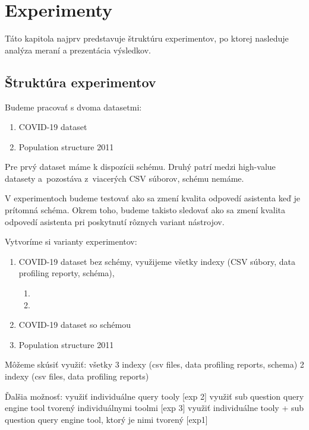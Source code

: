 \chapter{Experimenty}

Táto kapitola najprv predstavuje štruktúru experimentov, po ktorej nasleduje analýza meraní a prezentácia výsledkov.

\section{Štruktúra experimentov}

Budeme pracovať s dvoma datasetmi:
\begin{enumerate}
\item COVID-19 dataset
\item Population structure 2011
\end{enumerate}

Pre prvý dataset máme k dispozícii schému. Druhý patrí medzi high-value datasety a~pozostáva z~viacerých CSV súborov, schému nemáme.

V experimentoch budeme testovať ako sa zmení kvalita odpovedí asistenta keď je prítomná schéma. Okrem toho, budeme takisto sledovať ako sa zmení kvalita odpovedí asistenta pri poskytnutí rôznych variant nástrojov.

Vytvoríme si varianty experimentov:
\begin{enumerate}
\item COVID-19 dataset bez schémy, využijeme všetky indexy (CSV súbory, data profiling reporty, schéma), 
\begin{enumerate}
\item 
\item 
\end{enumerate}
\item COVID-19 dataset so schémou
\item Population structure 2011
\end{enumerate}


Môžeme skúsiť využiť:
všetky 3 indexy (csv files, data profiling reports, schema)
2 indexy (csv files, data profiling reports)

Ďalšia možnosť:
využiť individuálne query tooly [exp 2]
využiť sub question query engine tool tvorený individuálnymi toolmi [exp 3]
využiť individuálne tooly + sub question query engine tool, ktorý je nimi tvorený [exp1]

